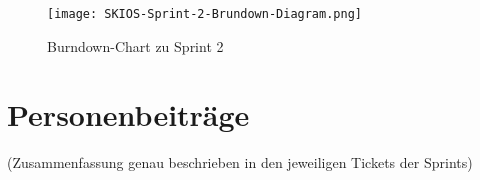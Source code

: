 \begin{figure}[h]
    \texttt{[image: SKIOS-Sprint-2-Brundown-Diagram.png]}
    \caption{Burndown-Chart zu Sprint 2}
    \label{fig:SKIOS-Sprint-2-Burndown}
\end{figure}

\section{Personenbeiträge}
(Zusammenfassung genau beschrieben in den jeweiligen Tickets der Sprints)
